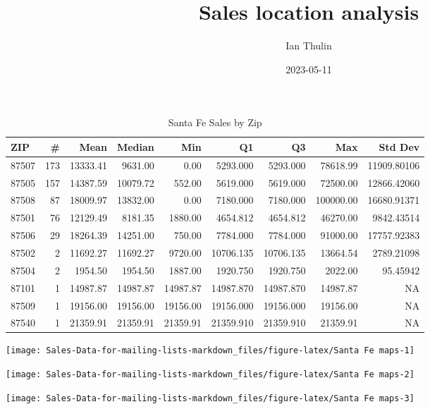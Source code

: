 \documentclass[
]{article}
\title{Sales location analysis}
\author{Ian Thulin}
\date{2023-05-11}
\begin{document}
\maketitle

\begin{table}

\caption{\label{tab:Santa Fe maps}Santa Fe Sales by Zip}
\centering
\begin{tabular}[t]{l|r|r|r|r|r|r|r|r}
\hline
ZIP & \# & Mean & Median & Min & Q1 & Q3 & Max & Std Dev\\
\hline
87507 & 173 & 13333.41 & 9631.00 & 0.00 & 5293.000 & 5293.000 & 78618.99 & 11909.80106\\
\hline
87505 & 157 & 14387.59 & 10079.72 & 552.00 & 5619.000 & 5619.000 & 72500.00 & 12866.42060\\
\hline
87508 & 87 & 18009.97 & 13832.00 & 0.00 & 7180.000 & 7180.000 & 100000.00 & 16680.91371\\
\hline
87501 & 76 & 12129.49 & 8181.35 & 1880.00 & 4654.812 & 4654.812 & 46270.00 & 9842.43514\\
\hline
87506 & 29 & 18264.39 & 14251.00 & 750.00 & 7784.000 & 7784.000 & 91000.00 & 17757.92383\\
\hline
87502 & 2 & 11692.27 & 11692.27 & 9720.00 & 10706.135 & 10706.135 & 13664.54 & 2789.21098\\
\hline
87504 & 2 & 1954.50 & 1954.50 & 1887.00 & 1920.750 & 1920.750 & 2022.00 & 95.45942\\
\hline
87101 & 1 & 14987.87 & 14987.87 & 14987.87 & 14987.870 & 14987.870 & 14987.87 & NA\\
\hline
87509 & 1 & 19156.00 & 19156.00 & 19156.00 & 19156.000 & 19156.000 & 19156.00 & NA\\
\hline
87540 & 1 & 21359.91 & 21359.91 & 21359.91 & 21359.910 & 21359.910 & 21359.91 & NA\\
\hline
\end{tabular}
\end{table}

\begin{center}\texttt{[image: Sales-Data-for-mailing-lists-markdown\_files/figure-latex/Santa Fe maps-1]} \end{center}

\begin{center}\texttt{[image: Sales-Data-for-mailing-lists-markdown\_files/figure-latex/Santa Fe maps-2]} \end{center}

\begin{center}\texttt{[image: Sales-Data-for-mailing-lists-markdown\_files/figure-latex/Santa Fe maps-3]} \end{center}
\end{document}
